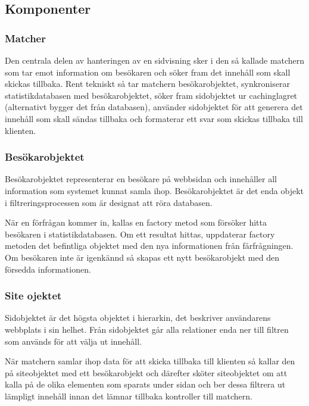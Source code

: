 \subsection{Komponenter}

\subsubsection{Matcher}

Den centrala delen av hanteringen av en sidvisning sker i den så kallade matchern som tar emot information om besökaren och söker fram det innehåll som skall skickas tillbaka. Rent tekniskt så tar matchern besökarobjektet, synkroniserar statistikdatabasen med besökarobjektet, söker fram sidobjektet ur cachinglagret (alternativt bygger det från databasen), använder sidobjektet för att generera det innehåll som skall sändas tillbaka och formaterar ett svar som skickas tillbaka till klienten.

\subsubsection{Besökarobjektet}

Besökarobjektet representerar en besökare på webbsidan och innehåller all information som systemet kunnat samla ihop. Besökarobjektet är det enda objekt i filtreringsprocessen som är designat att röra databasen.

När en förfrågan kommer in, kallas en factory metod som försöker hitta besökaren i statistikdatabasen. Om ett resultat hittas, uppdaterar factory metoden det befintliga objektet med den nya informationen från fårfrågningen. Om besökaren inte är igenkännd så skapas ett nytt besökarobjekt med den försedda informationen.

\subsubsection{Site ojektet}



Sidobjektet är det högsta objektet i hierarkin, det beskriver användarens webbplats i sin helhet. Från sidobjektet går alla relationer enda ner till filtren som används för att välja ut innehåll.

När matchern samlar ihop data för att skicka tillbaka till klienten så kallar den på siteobjektet med ett besökarobjekt och därefter sköter siteobjektet om att kalla på de olika elementen som sparats under sidan och ber dessa filtrera ut lämpligt innehåll innan det lämnar tillbaka kontroller till matchern.

